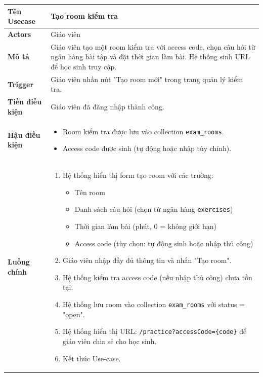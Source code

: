 \begin{longtable}{|p{}|p{}|}
\hline
\textbf{Tên Usecase} & \textbf{Tạo room kiểm tra} \\
\hline
\textbf{Actors} & Giáo viên \\
\hline
\textbf{Mô tả} & 
Giáo viên tạo một room kiểm tra với access code, chọn câu hỏi từ ngân hàng bài tập và đặt thời gian làm bài. Hệ thống sinh URL để học sinh truy cập. \\
\hline
\textbf{Trigger} & Giáo viên nhấn nút "Tạo room mới" trong trang quản lý kiểm tra. \\
\hline
\textbf{Tiền điều kiện} & Giáo viên đã đăng nhập thành công. \\
\hline
\textbf{Hậu điều kiện} & 
\vspace{-\baselineskip}
\begin{itemize}[topsep=2pt, itemsep=0pt]
    \item Room kiểm tra được lưu vào collection \texttt{exam\_rooms}.
    \item Access code được sinh (tự động hoặc nhập tùy chỉnh).
\end{itemize} \\
\hline
\textbf{Luồng chính} &
\vspace{-\baselineskip}
\begin{enumerate}[topsep=2pt, itemsep=0pt]
    \item Hệ thống hiển thị form tạo room với các trường:
    \begin{itemize}[topsep=0pt, itemsep=0pt]
        \item Tên room
        \item Danh sách câu hỏi (chọn từ ngân hàng \texttt{exercises})
        \item Thời gian làm bài (phút, 0 = không giới hạn)
        \item Access code (tùy chọn: tự động sinh hoặc nhập thủ công)
    \end{itemize}
    \item Giáo viên nhập đầy đủ thông tin và nhấn "Tạo room".
    \item Hệ thống kiểm tra access code (nếu nhập thủ công) chưa tồn tại.
    \item Hệ thống lưu room vào collection \texttt{exam\_rooms} với status = "open".
    \item Hệ thống hiển thị URL: \texttt{/practice?accessCode=\{code\}} để giáo viên chia sẻ cho học sinh.
    \item Kết thúc Use-case.
\end{enumerate} \\

\end{longtable}
